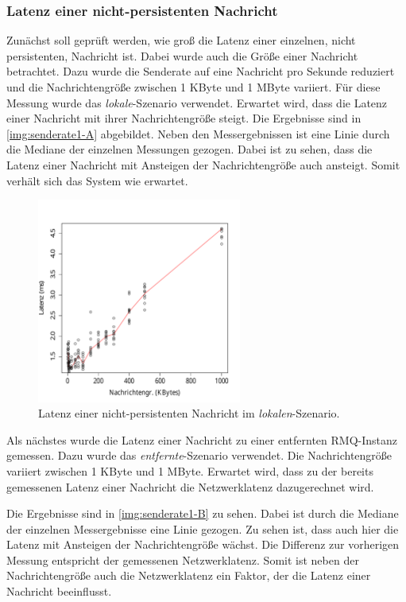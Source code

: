 \subsubsection{Latenz einer nicht-persistenten Nachricht}
\label{sec:oneMsgLatency}
Zunächst soll geprüft werden, wie groß die Latenz einer einzelnen, nicht persistenten, Nachricht ist. Dabei wurde auch die Größe einer Nachricht betrachtet. Dazu wurde die Senderate auf eine Nachricht pro Sekunde reduziert und die Nachrichtengröße zwischen 1 KByte und 1 MByte variiert. Für diese Messung wurde das \textit{lokale}-Szenario verwendet. Erwartet wird, dass die Latenz einer Nachricht mit ihrer Nachrichtengröße steigt.
Die Ergebnisse sind in \autoref{img:senderate1-A} abgebildet. Neben den Messergebnissen ist eine Linie durch die Mediane der einzelnen Messungen gezogen. Dabei ist zu sehen, dass die Latenz einer Nachricht mit Ansteigen der Nachrichtengröße auch ansteigt. Somit verhält sich das System wie erwartet.

\begin{figure}
\center
  \includegraphics[width=0.6\textwidth]{images/measurement/rate-limit-1-A.pdf}
  \caption{Latenz einer nicht-persistenten Nachricht im \textit{lokalen}-Szenario.}
  \label{img:senderate1-A}
\end{figure}

Als nächstes wurde die Latenz einer Nachricht zu einer entfernten RMQ-Instanz gemessen. Dazu wurde das \textit{entfernte}-Szenario verwendet. Die Nachrichtengröße variiert zwischen 1 KByte und 1 MByte. Erwartet wird, dass zu der bereits gemessenen Latenz einer Nachricht die Netzwerklatenz dazugerechnet wird.

Die Ergebnisse sind in \autoref{img:senderate1-B} zu sehen. Dabei ist durch die Mediane der einzelnen Messergebnisse eine Linie gezogen. Zu sehen ist, dass auch hier die Latenz mit Ansteigen der Nachrichtengröße wächst. Die Differenz zur vorherigen Messung entspricht der gemessenen Netzwerklatenz.
Somit ist neben der Nachrichtengröße auch die Netzwerklatenz ein Faktor, der die Latenz einer Nachricht beeinflusst.

